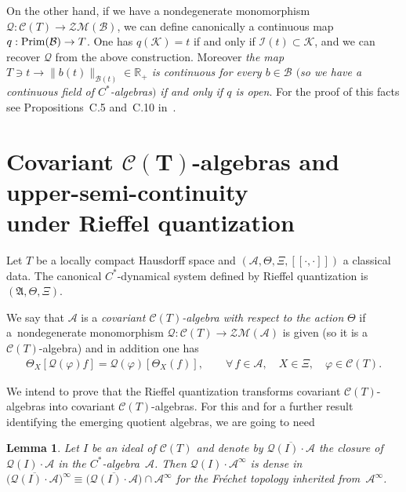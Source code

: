 \documentclass[pdftex]{sigma}
\def\A{{\mathcal A}}
\def\Th{\Theta}
\def\AA{\mathfrak A}
\def\C{\mathcal{C}}
\def\B{{\mathcal B}}
\def\Q{\mathcal Q}
\newtheorem{Lemma}[Theorem]{Lemma}
\begin{document}
On the other hand, if we have a nondegenerate monomorphism $\Q:\C(T)\to \mathcal Z\mathcal M(\B)$, we can def\/ine canonically
a continuous map $q:{\rm Prim}(\B)\to T$. One has $q(\mathcal K)=t$ if and only if $\mathcal I(t)\subset \mathcal K$,
and we can recover $\Q$ from the above construction.
Moreover {\it the map $T\ni t\to\| b(t)\|_{\B(t)}\in\mathbb R_+$ is continuous
for every $b\in\B$ $($so we have a continuous field of $C^*$-algebras$)$ if and only if $q$ is open}.
For the proof of this facts see Propositions~C.5 and~C.10 in~\cite{Wi}.



\section[Covariant $\C(T)$-algebras and upper-semi-continuity under Rieffel quantization]{Covariant $\boldsymbol{\C(T)}$-algebras and upper-semi-continuity\\ under Rief\/fel quantization}\label{isra}


Let $T$ be a locally compact Hausdorf\/f space and $(\A,\Th,\Xi,[\![\cdot,\cdot]\!])$ a classical data.
The canonical $C^*$-dynamical system def\/ined by Rief\/fel quantization is $(\AA,\Th,\Xi)$.

\begin{Definition}\label{cedete+}
We say that $\A$ is a {\it covariant $\C(T)$-algebra with respect to the action} $\Th$
if a~nondegenerate monomorphism $\Q:\C(T)\rightarrow\mathcal Z\mathcal M(\A)$ is given
(so it is a $\C(T)$-algebra) and in addition one has
\begin{gather}\label{incep}
\Th_X[\Q(\varphi)f]=\Q(\varphi)\left[\Th_X(f)\right],\qquad \forall\,f\in\A,\quad X\in\Xi,\quad \varphi\in\C(T) .
\end{gather}
\end{Definition}

We intend to prove that the Rief\/fel quantization transforms covariant $\C(T)$-algebras into covariant $\C(T)$-algebras.
For this and for a further result identifying the emerging quotient algebras, we are going to need

\begin{Lemma}\label{densly}
Let $I$ be an ideal of $\C(T)$ and denote by $\overline{\Q(I)\cdot\A}$ the closure of $\Q(I)\cdot\A$ in the $C^*$-algebra~$\A$.
Then $\Q(I)\cdot\A^\infty$ is dense in
$\big(\overline{\Q(I)\cdot\A}\big)^\infty\equiv\big(\overline{\Q(I)\cdot\A}\big)\cap\A^\infty$
for the Fr\'echet topology inherited from~$\A^\infty$.
\end{Lemma}
\end{document}
